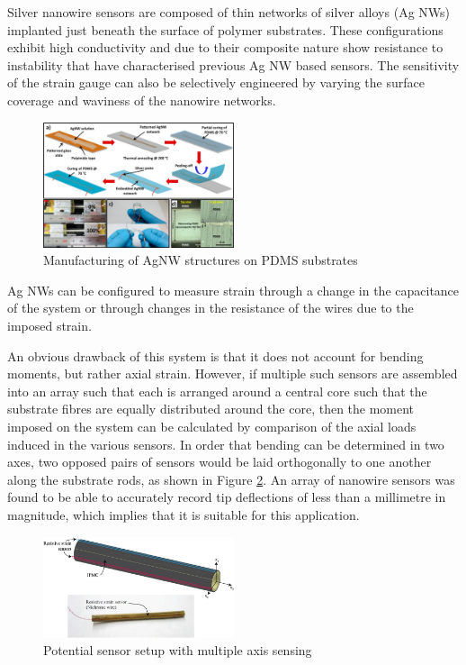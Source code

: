 \documentclass[conference, a4paper]{IEEEtran}
\begin{document}
Silver nanowire sensors are composed of thin networks of silver alloys (Ag NWs) implanted just beneath the
surface of polymer substrates\cite{Amjadi2014}\cite{Lee2016}. These configurations exhibit high conductivity and due to their composite
nature show resistance to instability that have characterised previous Ag NW based sensors\cite{Lee2016}. The sensitivity
of the strain gauge can also be selectively engineered by varying the surface coverage and waviness of the
nanowire networks\cite{Xu2012}.

\begin{figure}[h!]
	\centering
	\includegraphics[width=0.5\textwidth]{assets/manufacturingNano.jpg}
	\caption{Manufacturing of AgNW structures on PDMS substrates\cite{Amjadi2014}}
	\label{fig:manufacture}
\end{figure}

Ag NWs can be configured to measure strain through a change in the capacitance of the system\cite{Ho2015} or through
changes in the resistance of the wires due to the imposed strain.



An obvious drawback of this system is that it does not account for bending moments, but rather axial strain.
However, if multiple such sensors are assembled into an array such that each is arranged around a central core
such that the substrate fibres are equally distributed around the core, then the moment imposed on the system
can be calculated by comparison of the axial loads induced in the various sensors. In order that bending can be
determined in two axes, two opposed pairs of sensors would be laid orthogonally to one another along the
substrate rods, as shown in Figure \ref{fig:potential}. An array of nanowire sensors was
found to be able to accurately record tip deflections of less than a millimetre in magnitude, which implies that it
is suitable for this application.\cite{Ho2015}

\begin{figure}[h!]
	\centering
	\includegraphics[width=0.5\textwidth]{assets/sensorSetup.jpg}
	\caption{Potential sensor setup with multiple axis sensing\cite{Tsugawa2015}}
	\label{fig:potential}
\end{figure}
\end{document}
